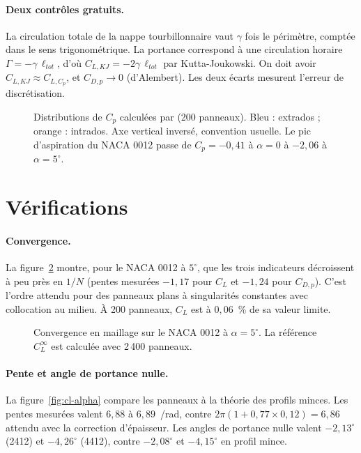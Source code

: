 \paragraph{Deux contrôles gratuits.} La circulation totale de la nappe tourbillonnaire vaut $\gamma$ fois le périmètre, comptée dans le sens trigonométrique. La portance correspond à une circulation horaire $\Gamma=-\gamma\,\ell_{tot}$, d'où $C_{L,KJ}=-2\gamma\,\ell_{tot}$ par Kutta-Joukowski. On doit avoir $C_{L,KJ}\approx C_{L,C_p}$, et $C_{D,p}\to0$ (d'Alembert). Les deux écarts mesurent l'erreur de discrétisation.

\begin{figure}[htbp]
\centering

\caption{Distributions de $C_p$ calculées par  (200 panneaux). Bleu : extrados ; orange : intrados. Axe vertical inversé, convention usuelle. Le pic d'aspiration du NACA 0012 passe de $C_p=-0{,}41$ à $\alpha=0$ à $-2{,}06$ à $\alpha=5^\circ$.}\label{fig:cp}
\end{figure}

\section{Vérifications}
\paragraph{Convergence.} La figure~\ref{fig:convergence} montre, pour le NACA 0012 à $5^\circ$, que les trois indicateurs décroissent à peu près en $1/N$ (pentes mesurées $-1{,}17$ pour $C_L$ et $-1{,}24$ pour $C_{D,p}$). C'est l'ordre attendu pour des panneaux plans à singularités constantes avec collocation au milieu. À 200 panneaux, $C_L$ est à $0{,}06$~\% de sa valeur limite.

\begin{figure}[htbp]
\centering

\caption{Convergence en maillage sur le NACA 0012 à $\alpha=5^\circ$. La référence $C_L^\infty$ est calculée avec 2\,400 panneaux.}\label{fig:convergence}
\end{figure}

\paragraph{Pente et angle de portance nulle.} La figure~\ref{fig:cl-alpha} compare les panneaux à la théorie des profils minces. Les pentes mesurées valent $6{,}88$ à $6{,}89$~/rad, contre $2\pi(1+0{,}77\times0{,}12)=6{,}86$ attendu avec la correction d'épaisseur. Les angles de portance nulle valent $-2{,}13^\circ$ (2412) et $-4{,}26^\circ$ (4412), contre $-2{,}08^\circ$ et $-4{,}15^\circ$ en profil mince.

